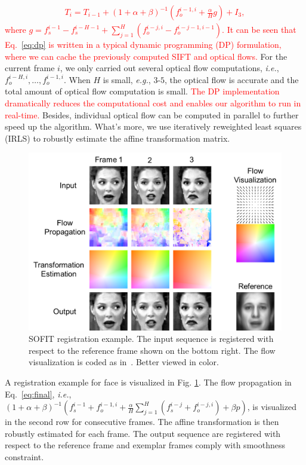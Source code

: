 \documentclass[10pt,journal]{IEEEtran}
\newcommand{\Songfan}[1]{\textcolor{red}{#1}}
\begin{document}
\Songfan{
\begin{align}
\label{eq:dp}
T_i=T_{i-1}+(1+\alpha+\beta)^{-1}(f_o^{i-1,i}+\frac{\alpha}{H}g) + I_3,
\end{align}
}
\noindent \Songfan{where $g=f_s^{i-1}-f_s^{i-H-1}+\sum_{j=1}^H(f_o^{i-j,i}-f_o^{i-j-1,i-1})$. It can be seen that Eq.~\eqref{eq:dp} is written in a typical dynamic programming (DP) formulation, where we can cache the previously computed SIFT and optical flows.} For the current frame $i$, we only carried out several optical flow computations, \textit{i.e.}, $f_o^{i-H,i},\ldots,f_o^{i-1,i}$. When $H$ is small, \textit{e.g.}, $3$-$5$, the optical flow is accurate and the total amount of optical flow computation is small. \Songfan{The DP implementation dramatically reduces the computational cost and enables our algorithm to run in real-time.} Besides, individual optical flow can be computed in parallel to further speed up the algorithm. What's more, we use iteratively reweighted least squares (IRLS) \cite{Huber81} to robustly estimate the affine transformation matrix. 

\begin{figure}[htbp]
	\centering
		\includegraphics[width=\columnwidth]{fig/theory_example.png}
	\caption{SOFIT registration example. The input sequence is registered with respect to the reference frame shown on the bottom right. The flow visualization is coded as in~\cite{Baker_ICCV07}. Better viewed in color.}
	\label{fig_theory_example}
\end{figure}

A registration example for face is visualized in Fig. \ref{fig_theory_example}. The flow propagation in Eq.~\eqref{eq:final}, \textit{i.e.}, $(1+\alpha+\beta)^{-1}(f_s^{i-1}+f_o^{i-1,i}+\frac{\alpha}{H}\sum_{j=1}^H(f_s^{i-j}+f_o^{i-j,i})+\beta{p})$, is visualized in the second row for consecutive frames. The affine transformation is then robustly estimated for each frame. The output sequence are registered with respect to the reference frame and exemplar frames comply with smoothness constraint. 
\end{document}
